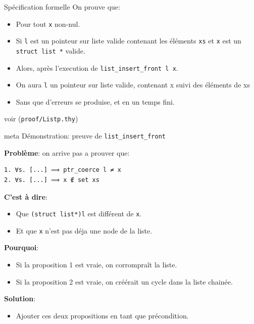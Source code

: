 \documentclass[hyperref={pdfpagelabels=false}]{beamer}
\begin{document}
\begin{frame}[fragile]{Spécification formelle}
  On prouve que:\\
  \begin{itemize}
    \item<2-> Pour tout \texttt{x} non-nul.
    \item<3-> Si \texttt{l} est un pointeur sur liste valide contenant les éléments \texttt{xs} et \texttt{x} est un \texttt{struct list *} valide.
    \item<4-> Alors, après l'execution de \texttt{list\_insert\_front l x}.
    \item<5-> On aura \texttt{l} un pointeur sur liste valide, contenant x suivi des éléments de xs
    \item<6-> Sans que d'erreurs se produise, et en un temps fini.
  \end{itemize}

  \vfill
  \hfill
  {\tiny voir (\texttt{proof/Listp.thy})}
\end{frame}

\begin{frame}

  \begin{beamercolorbox}[sep=8pt,center,shadow=true,rounded=true]{meta}
    Démonstration: preuve de \texttt{list\_insert\_front}\par%
  \end{beamercolorbox}
\end{frame}

\begin{frame}[fragile]
  \textbf{Problème}: on arrive pas a prouver que:
  \begin{lstlisting}
1. ∀s. [...] ⟹ ptr_coerce l ≠ x
2. ∀s. [...] ⟹ x ∉ set xs
  \end{lstlisting}
  \pause
  \textbf{C'est à dire}:
  \begin{itemize}
    \item Que \texttt{(struct list*)l} est différent de \texttt{x}.
    \item Et que \texttt{x} n'est pas déja une node de la liste.
  \end{itemize}
  \pause
  \textbf{Pourquoi}:
  \begin{itemize}
    \item Si la proposition 1 est vraie, on corrompraît la liste.
    \item Si la proposition 2 est vraie, on créérait un cycle dans la liste chainée.
  \end{itemize}
  \pause
  \textbf{Solution}:
  \begin{itemize}
    \item Ajouter ces deux propositions en tant que précondition.
  \end{itemize}
\end{frame}
\end{document}
